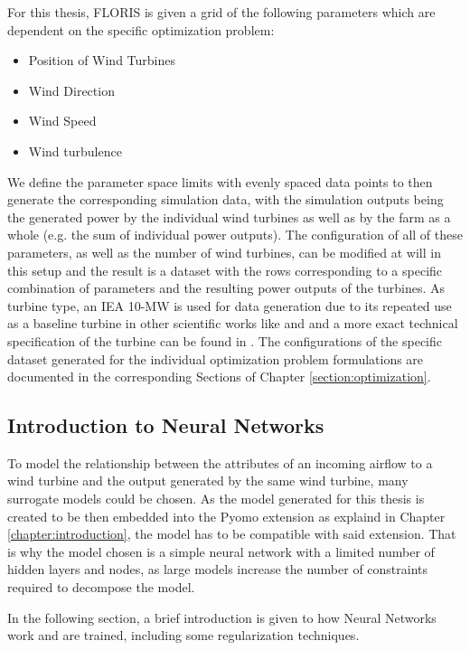 \documentclass[preprint,12pt]{elsarticle}
\begin{document}
For this thesis, FLORIS is given a grid of the following parameters which are dependent on the specific optimization problem:

\begin{itemize}
	\item Position of Wind Turbines
	\item Wind Direction
	\item Wind Speed
	\item Wind turbulence
\end{itemize}

We define the parameter space limits with evenly spaced data points to then generate the corresponding simulation data, with the simulation outputs being the generated power by the individual wind turbines as well as by the farm as a whole (e.g. the sum of individual power outputs). The configuration of all of these parameters, as well as the number of wind turbines, can be modified at will in this setup and the result is a dataset with the rows corresponding to a specific combination of parameters and the resulting power outputs of the turbines. As turbine type, an IEA 10-MW is used for data generation due to its repeated use as a baseline turbine in other scientific works like \cite{Madsen2022} and \cite{Kainz2024IEA} and a more exact technical specification of the turbine can be found in \cite{Bortolotti2019}. The configurations of the specific dataset generated for the individual optimization problem formulations are documented in the corresponding Sections of Chapter \ref{section:optimization}.


\subsection{Introduction to Neural Networks} \label{sec:modelling}

To model the relationship between the attributes of an incoming airflow to a wind turbine and the output generated by the same wind turbine, many surrogate models could be chosen. As the model generated for this thesis is created to be then embedded into the Pyomo extension as explaind in Chapter \ref{chapter:introduction}, the model has to be compatible with said extension. That is why the model chosen is a simple neural network with a limited number of hidden layers and nodes, as large models increase the number of constraints required to decompose the model. 

In the following section, a brief introduction is given to how Neural Networks work and are trained, including some regularization techniques.
\end{document}
